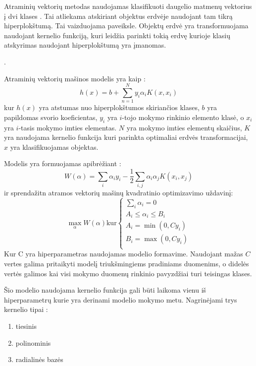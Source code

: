 Atraminių vektorių metodas naudojamas klasifikuoti daugelio matmenų vektorius į dvi klases \cite{comp}. Tai atliekama atskiriant objektus erdvėje naudojant tam tikrą hiperplokštumą. Tai vaizduojama  paveiksle. Objektų erdvė yra transformuojama naudojant kernelio funkciją, kuri leidžia parinkti tokią erdvę kurioje klasių atskyrimas naudojant hiperplokštumą yra įmanomas.

.

Atraminių vektorių mašinos modelis yra kaip \cite{comp}:
\begin{equation}
    h(x) = b + \sum_{n=1}^{N}y_i \alpha_i K(x, x_i)
\end{equation}
kur $h(x)$ yra atstumas nuo hiperplokštumos skiriančios klases, $b$ yra papildomas svorio koeficientas, $y_i$ yra $i$-tojo mokymo rinkinio elemento klasė, o $x_i$ yra $i$-tasis mokymo imties elementas. $N$ yra mokymo imties elementų skaičius, $K$ yra naudojama kernelio funkcija kuri parinkta optimaliai erdvės transformacijai, $x$ yra klasifikuojamas objektas.

Modelis yra formuojamas apibrėžiant \cite{ksvm}:
\begin{equation}
    W(\alpha) = \sum_{i}\alpha_i y_i - \frac{1}{2} \sum_{i, j} \alpha_i \alpha_j K(x_i, x_j)
\end{equation}
ir sprendažitn atramos vektorių mašinų kvadratinio optimizavimo uždavinį:
\begin{equation}
\max_{\alpha} W(\alpha) \text{kur} \left\{
                  \begin{array}{l}
                    \sum_{i} \alpha_i = 0 \\
                    A_i \leq \alpha_i \leq B_i \\
                    A_i = \min(0, Cy_i) \\
                    B_i = \max(0, Cy_i) \\
                  \end{array}
                \right.
\end{equation}
Kur C yra hiperparametras naudojamas modelio formavime. Naudojant mažas $C$ vertes galima pritaikyti modelį triukšmingiems pradiniams duomenims, o didelės vertės galimos kai visi mokymo duomenų rinkinio pavyzdžiai turi teisingas klases.

Šio modelio naudojama kernelio funkcija gali būti laikoma vienu iš hiperparametrų kurie yra derinami modelio mokymo metu. Nagrinėjami trys kernelio tipai \cite{vw}:
\begin{enumerate}
    \item tiesinis
    \item polinominis
    \item radialinės bazės
\end{enumerate}

